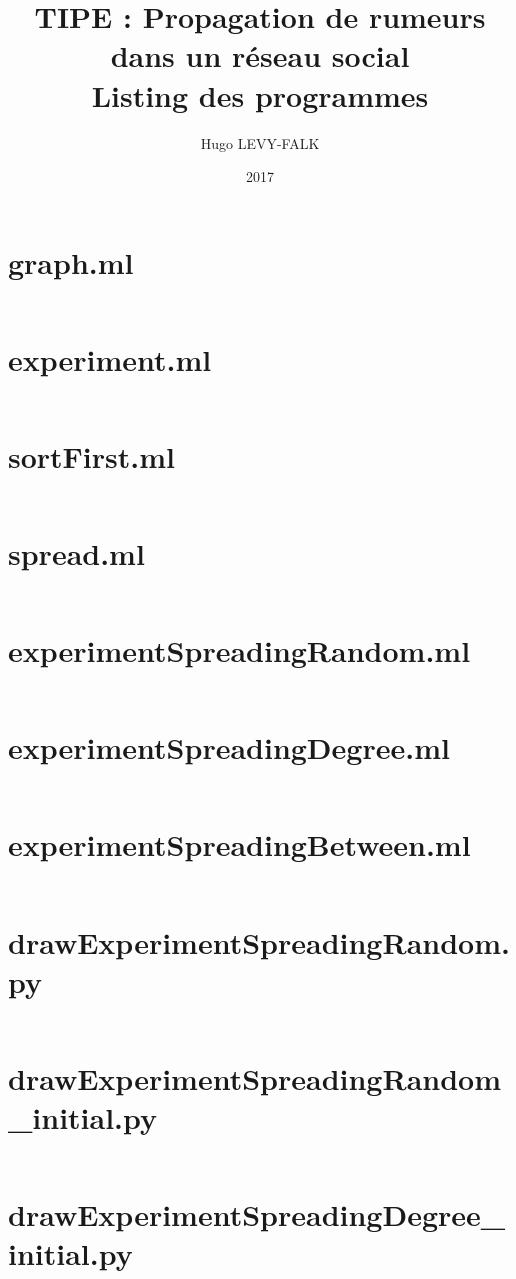 \documentclass{article}
\title{TIPE : Propagation de rumeurs dans un réseau social\\Listing des programmes}
\author{Hugo LEVY-FALK}
\date{2017}
\begin{document}
\maketitle
{}\;
\tableofcontents
\newpage

\section{graph.ml}
\inputminted{ocaml}{../../generationDeGraph/graph.ml}

\section{experiment.ml}
\inputminted{ocaml}{../../generationDeGraph/experiment.ml}

\section{sortFirst.ml}
\inputminted{ocaml}{../../generationDeGraph/sortFirst.ml}

\section{spread.ml}
\inputminted{ocaml}{../../generationDeGraph/spread.ml}

\section{experimentSpreadingRandom.ml}
\inputminted{ocaml}{../../generationDeGraph/experimentSpreadingRandom.ml}

\section{experimentSpreadingDegree.ml}
\inputminted{ocaml}{../../generationDeGraph/experimentSpreadingDegree.ml}

\section{experimentSpreadingBetween.ml}
\inputminted{ocaml}{../../generationDeGraph/experimentSpreadingBetween.ml}

\section{drawExperimentSpreadingRandom.py}
\inputminted{python}{../../generationDeGraph/drawExperimentSpreadingRandom.py}

\section{drawExperimentSpreadingRandom\_initial.py}
\inputminted{python}{../../generationDeGraph/drawExperimentSpreadingRandom_initial.py}

\section{drawExperimentSpreadingDegree\_initial.py}
\inputminted{python}{../../generationDeGraph/drawExperimentSpreadingDegree_initial.py}
\end{document}
